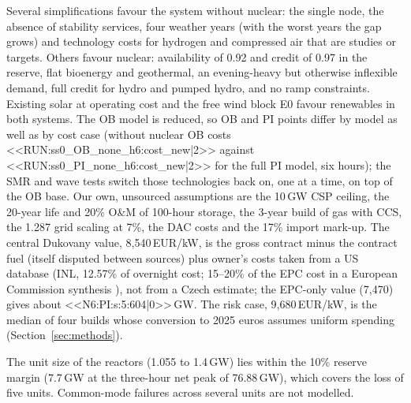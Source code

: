Several simplifications favour the system without nuclear: the single node, the absence of stability services, four weather years (with the worst years the gap grows) and technology costs for hydrogen and compressed air that are studies or targets. Others favour nuclear: availability of 0.92 and credit of 0.97 in the reserve, flat bioenergy and geothermal, an evening-heavy but otherwise inflexible demand, full credit for hydro and pumped hydro, and no ramp constraints. Existing solar at operating cost and the free wind block E0 favour renewables in both systems. The OB model is reduced, so OB and PI points differ by model as well as by cost case (without nuclear OB costs <<RUN:ss0_OB_none_h6:cost_new|2>> against <<RUN:ss0_PI_none_h6:cost_new|2>> for the full PI model, six hours); the SMR and wave tests switch those technologies back on, one at a time, on top of the OB base. Our own, unsourced assumptions are the 10\,GW CSP ceiling, the 20-year life and 20\% O\&M of 100-hour storage, the 3-year build of gas with CCS, the 1.287 grid scaling at 7\%, the DAC costs and the 17\% import mark-up. The central Dukovany value, 8{,}540\,EUR/kW, is the gross contract minus the contract fuel (itself disputed between sources) plus owner's costs taken from a US database (INL, 12.57\% of overnight cost; 15--20\% of the EPC cost in a European Commission synthesis \citep{DHaeseleer2013}), not from a Czech estimate; the EPC-only value (7{,}470) gives about <<N6:PI:s:5:604|0>>\,GW. The risk case, 9{,}680\,EUR/kW, is the median of four builds whose conversion to 2025 euros assumes uniform spending (Section~\ref{sec:methods}).

The unit size of the reactors (1.055 to 1.4\,GW) lies within the 10\% reserve margin (7.7\,GW at the three-hour net peak of 76.88\,GW), which covers the loss of five units. Common-mode failures across several units are not modelled.
